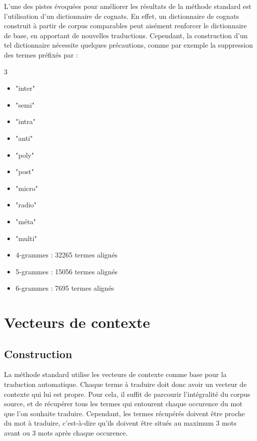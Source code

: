 	L'une des pistes évoquées pour améliorer les résultats de la méthode standard est l'utilisation d'un dictionnaire de cognats. En effet, un dictionnaire de cognats construit à partir de corpus comparables peut aisément renforcer le dictionnaire de base, en apportant de nouvelles traductions. Cependant, la construction d'un tel dictionnaire nécessite quelques précautions, comme par exemple la suppression des termes préfixés par :
	\begin {multicols}{3}
	\begin{itemize}
		\item "inter"
		\item "semi"
		\item "intra"
		\item "anti"
		\item "poly"
		\item "post"
		\item "micro"
		\item "radio"
		\item "méta"
		\item "multi"
	\end{itemize}
	\end {multicols}	

	\vspace{0.5cm}
	
	\begin{itemize}
		\item 4-grammes : 32265 termes alignés
		\item 5-grammes : 15056 termes alignés
		\item 6-grammes : 7695 termes alignés
	\end{itemize}
	

\section{Vecteurs de contexte}

	\subsection{Construction}
	
	La méthode standard utilise les vecteurs de contexte comme base pour la traduction automatique. Chaque terme à traduire doit donc avoir un vecteur de contexte qui lui est propre. Pour cela, il suffit de parcourir l'intégralité du corpus source, et de récupérer tous les termes qui entourent chaque occurence du mot que l'on souhaite traduire. Cependant, les termes récupérés doivent être proche du mot à traduire, c'est-à-dire qu'ils doivent être situés au maximum 3 mots avant ou 3 mots après chaque occurence. \\
	
